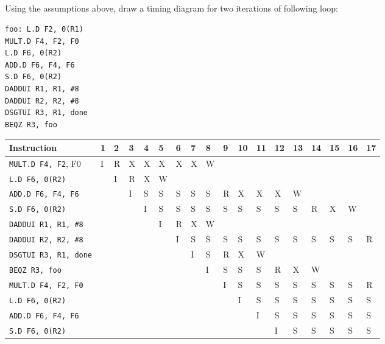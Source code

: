 \documentclass{article}
\begin{document}
\begin{adjustwidth}{2.5em}{0pt}
\subsection{}
Using the assumptions above, draw a timing diagram for two iterations of following loop: 


\begin{lstlisting}
foo: L.D F2, 0(R1)
MULT.D F4, F2, F0
L.D F6, 0(R2)
ADD.D F6, F4, F6
S.D F6, 0(R2)
DADDUI R1, R1, #8
DADDUI R2, R2, #8
DSGTUI R3, R1, done 
BEQZ R3, foo
\end{lstlisting}


\vspace{5mm}

\vspace{5mm}
\begin{tabular}{|p{3.5cm}|p{.2cm}|p{.2cm}|p{.2cm}|p{.2cm}|p{.2cm}|p{.2cm}|p{.2cm}|p{.2cm}|p{.2cm}|p{.2cm}|p{.2cm}|p{.2cm}|p{.2cm}|p{.2cm}|p{.2cm}|p{.2cm}|p{.2cm}|}
\hline
\textbf{Instruction}&\textbf{1} &\textbf{2} &\textbf{3} &\textbf{4} &\textbf{5} &\textbf{6} &\textbf{7} &\textbf{8} &\textbf{9} &\textbf{10} &\textbf{11} &\textbf{12} &\textbf{13} &\textbf{14} &\textbf{15} &\textbf{16} &\textbf{17} \\
\hline
\texttt{MULT.D F4, F2}, F0& I& R& X& X& X& X& X& W& & & & & & & & & \\
\texttt{L.D F6, 0(R2)}& & I& R& X& W& & & & & & & & & & & & \\
\texttt{ADD.D F6, F4, F6}& & & I& S& S& S& S& S& R& X& X& X& W& & & & \\
\texttt{S.D F6, 0(R2)}& & & & I& S& S& S& S& S& S& S& S& S& R& X& W& \\
\texttt{DADDUI R1, R1, \#8}& & & & & I& R& X& W& & & & & & & & & \\
\texttt{DADDUI R2, R2, \#8}& & & & & & I& S& S& S& S& S& S& S& S& S& S& R\\
\texttt{DSGTUI R3, R1, done} & & & & & & & I& S& R& X& W& & & & & & \\
\texttt{BEQZ R3, foo}& & & & & & & & I& S& S& S& R& X& W& & & \\
\texttt{MULT.D F4, F2, F0}& & & & & & & & & I& S& S& S& S& S& S& S& R\\
\texttt{L.D F6, 0(R2)}& & & & & & & & & & I& S& S& S& S& S& S& S\\
\texttt{ADD.D F6, F4, F6} & & & & & & & & & & & I& S& S& S& S& S& S\\
\texttt{S.D F6, 0(R2)} & & & & & & & & & & & & I& S& S& S& S& S\\

\end{tabular}
\end{adjustwidth}
\end{document}
